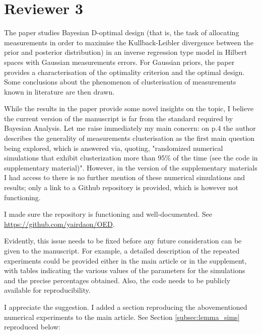 \section{Reviewer 3}\label{ref3}
\RC The paper studies Bayesian D-optimal design (that is, the task of
allocating measurements in order to maximise the Kullback-Leibler
divergence between the prior and posterior distribution) in an inverse
regression type model in Hilbert spaces with Gaussian measurements
errors. For Gaussian priors, the paper provides a characterisation of
the optimality criterion and the optimal design. Some conclusions
about the phenomenon of clusterisation of measurements known in
literature are then drawn.


\RC While the results in the paper provide some novel insights on the
topic, I believe the current version of the manuscript is far from the
standard required by Bayesian Analysis. Let me raise immediately my
main concern: on p.4 the author describes the generality of
measurements clusterisation as the first main question being explored,
which is answered via, quoting, "randomized numerical simulations that
exhibit clusterization more than 95\% of the time (see the code in
supplementary material)". However, in the version of the supplementary
materials I had access to there is no further mention of these
numerical simulations and results; only a link to a Github repository
is provided, which is however not functioning.

\AR I made sure the repository is functioning and well-documented. See
\url{https://github.com/yairdaon/OED}.


\RC Evidently, this issue needs to be fixed before any future
consideration can be given to the manuscript. For example, a detailed
description of the repeated experiments could be provided either in
the main article or in the supplement, with tables indicating the
various values of the parameters for the simulations and the precise
percentages obtained. Also, the code needs to be publicly available
for reproducibility.

\AR I appreciate the suggestion. I added a section reproducing the
abovementioned numerical experiments to the main article. See Section
\ref{subsec:lemma_sims} reproduced below:


